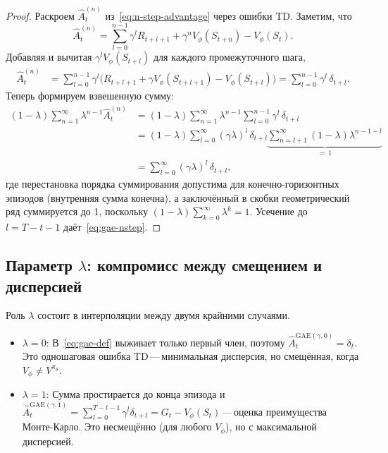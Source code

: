 \begin{proof}
Раскроем $\hat{A}_t^{(n)}$ из~\eqref{eq:n-step-advantage} через ошибки TD. Заметим, что
\[
\hat{A}_t^{(n)}
= \sum_{l=0}^{n-1}\gamma^l R_{t+l+1} + \gamma^n V_\phi(S_{t+n}) - V_\phi(S_t).
\]
Добавляя и вычитая $\gamma^l V_\phi(S_{t+l})$ для каждого промежуточного шага,
\begin{align*}
\hat{A}_t^{(n)}
&= \sum_{l=0}^{n-1} \gamma^l
   \bigl(R_{t+l+1} + \gamma V_\phi(S_{t+l+1}) - V_\phi(S_{t+l})\bigr)
 = \sum_{l=0}^{n-1}\gamma^l\,\delta_{t+l}.
\end{align*}
Теперь формируем взвешенную сумму:
\begin{align*}
(1-\lambda)\sum_{n=1}^{\infty}\lambda^{n-1}\hat{A}_t^{(n)}
&= (1-\lambda)\sum_{n=1}^{\infty}\lambda^{n-1}
   \sum_{l=0}^{n-1}\gamma^l\,\delta_{t+l} \\
&= (1-\lambda)\sum_{l=0}^{\infty}(\gamma\lambda)^l\,\delta_{t+l}
   \underbrace{\sum_{n=l+1}^{\infty}(1-\lambda)\lambda^{n-1-l}}_{=\,1} \\
&= \sum_{l=0}^{\infty}(\gamma\lambda)^l\,\delta_{t+l},
\end{align*}
где перестановка порядка суммирования допустима для конечно-горизонтных эпизодов (внутренняя сумма конечна), а заключённый в скобки геометрический ряд суммируется до 1, поскольку $(1-\lambda)\sum_{k=0}^{\infty}\lambda^k = 1$. Усечение до $l = T-t-1$ даёт~\eqref{eq:gae-nstep}.
\end{proof}

\subsection{Параметр $\lambda$: компромисс между смещением и дисперсией}

Роль $\lambda$ состоит в интерполяции между двумя крайними случаями.

\begin{itemize}[leftmargin=*]
  \item \textbf{$\lambda = 0$}: В~\eqref{eq:gae-def} выживает только первый член, поэтому $\hat{A}_t^{\mathrm{GAE}(\gamma,0)} = \delta_t$. Это одношаговая ошибка TD\,---\,минимальная дисперсия, но смещённая, когда $V_\phi \neq V^{\pi_\theta}$.
  \item \textbf{$\lambda = 1$}: Сумма простирается до конца эпизода и $\hat{A}_t^{\mathrm{GAE}(\gamma,1)} = \sum_{l=0}^{T-t-1}\gamma^l \delta_{t+l} = G_t - V_\phi(S_t)$\,---\,оценка преимущества Монте-Карло. Это несмещённо (для любого $V_\phi$), но с максимальной дисперсией.
\end{itemize}

